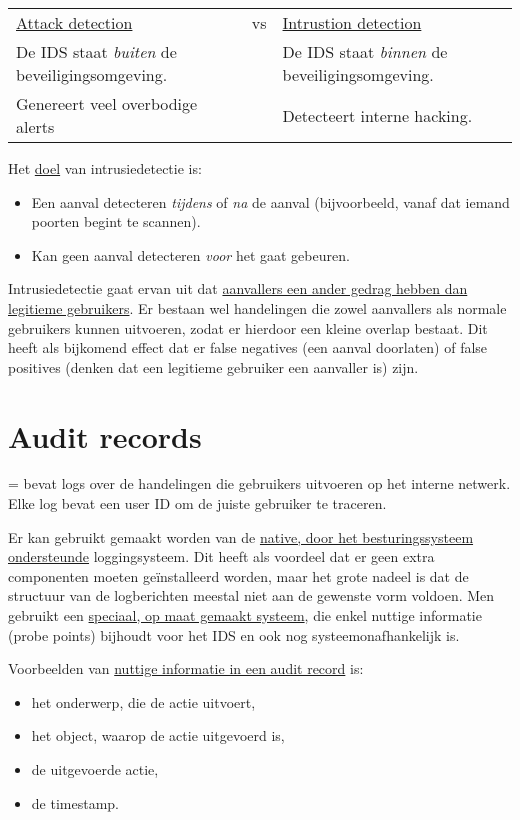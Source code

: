 \documentclass{report}
\begin{document}
	\begin{table}[ht]
		\begin{tabular}{l c l}
			\underline{Attack detection} & vs & \underline{Intrustion detection} \\
			De IDS staat \emph{buiten} de beveiligingsomgeving. & & De IDS staat \emph{binnen} de beveiligingsomgeving. \\
			Genereert veel overbodige alerts & & Detecteert interne hacking.
		\end{tabular}
	\end{table}

	Het \underline{doel} van intrusiedetectie is:
	\begin{itemize}
		\item Een aanval detecteren \emph{tijdens} of \emph{na} de aanval (bijvoorbeeld, vanaf dat iemand poorten begint te scannen).
		\item Kan geen aanval detecteren \emph{voor} het gaat gebeuren.
	\end{itemize}

	Intrusiedetectie gaat ervan uit dat \underline{aanvallers een ander gedrag hebben dan legitieme gebruikers}. Er bestaan wel handelingen die zowel aanvallers als normale gebruikers kunnen uitvoeren, zodat er hierdoor een kleine overlap bestaat. Dit heeft als bijkomend effect dat er false negatives (een aanval doorlaten) of false positives (denken dat een legitieme gebruiker een aanvaller is) zijn.

	\section{Audit records}
	= bevat logs over de handelingen die gebruikers uitvoeren op het interne netwerk. Elke log bevat een user ID om de juiste gebruiker te traceren.

	Er kan gebruikt gemaakt worden van de \underline{native, door het besturingssysteem ondersteunde} loggingsysteem. Dit heeft als voordeel dat er geen extra componenten moeten geïnstalleerd worden, maar het grote nadeel is dat de structuur van de logberichten meestal niet aan de gewenste vorm voldoen. Men gebruikt een \underline{speciaal, op maat gemaakt systeem}, die enkel nuttige informatie (probe points) bijhoudt voor het IDS en ook nog systeemonafhankelijk is. 

	Voorbeelden van \underline{nuttige informatie in een audit record} is:
	\begin{itemize}
		\item het onderwerp, die de actie uitvoert,
		\item het object, waarop de actie uitgevoerd is,
		\item de uitgevoerde actie,
		\item de timestamp.
	\end{itemize}
\end{document}
